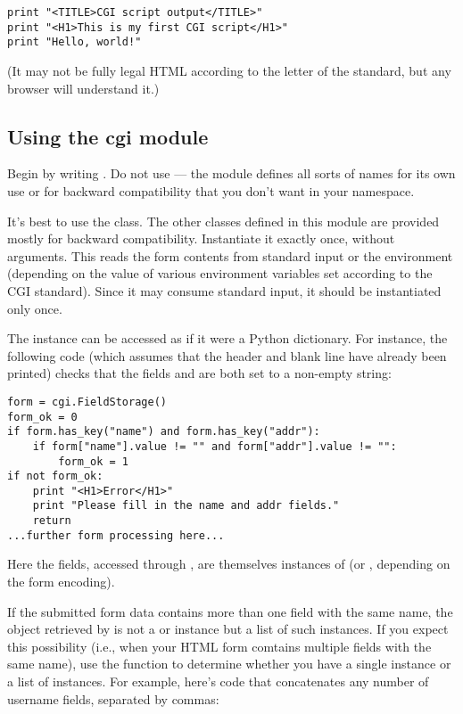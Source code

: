 \begin{verbatim}
print "<TITLE>CGI script output</TITLE>"
print "<H1>This is my first CGI script</H1>"
print "Hello, world!"
\end{verbatim}

(It may not be fully legal HTML according to the letter of the
standard, but any browser will understand it.)

\subsection{Using the cgi module}

Begin by writing .  Do not use  --- the module defines all sorts of names for its own use or for
backward compatibility that you don't want in your namespace.

It's best to use the  class.  The other classes
defined in this module are provided mostly for backward compatibility.
Instantiate it exactly once, without arguments.  This reads the form
contents from standard input or the environment (depending on the
value of various environment variables set according to the CGI
standard).  Since it may consume standard input, it should be
instantiated only once.

The  instance can be accessed as if it were a Python 
dictionary.  For instance, the following code (which assumes that the 
 header and blank line have already been printed)
checks that the fields  and  are both set to a
non-empty string:

\begin{verbatim}
form = cgi.FieldStorage()
form_ok = 0
if form.has_key("name") and form.has_key("addr"):
    if form["name"].value != "" and form["addr"].value != "":
        form_ok = 1
if not form_ok:
    print "<H1>Error</H1>"
    print "Please fill in the name and addr fields."
    return
...further form processing here...
\end{verbatim}

Here the fields, accessed through , are
themselves instances of  (or
, depending on the form encoding).

If the submitted form data contains more than one field with the same
name, the object retrieved by  is not a
 or 
instance but a list of such instances.  If you expect this possibility
(i.e., when your HTML form comtains multiple fields with the same
name), use the  function to determine whether you
have a single instance or a list of instances.  For example, here's
code that concatenates any number of username fields, separated by
commas:

